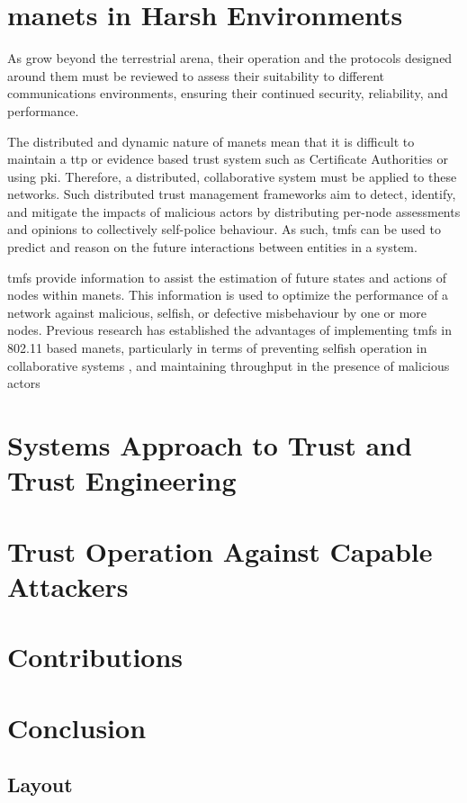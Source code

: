 
\section{\glspl{manet} in Harsh Environments}

As  grow beyond the terrestrial arena, their operation and the protocols designed around them must be reviewed to assess their suitability to different communications environments, ensuring their continued security, reliability, and performance.

The distributed and dynamic nature of \glspl{manet} mean that it is difficult to maintain a \gls{ttp} or evidence based trust system such as Certificate Authorities or using \gls{pki}.
Therefore, a distributed, collaborative system must be applied to these networks.
Such distributed trust management frameworks aim to detect, identify, and mitigate the impacts of malicious actors by distributing per-node assessments and opinions to collectively self-police behaviour.
As such, \glspl{tmf} can be used to predict and reason on the future interactions between entities in a system.

\glspl{tmf} provide information to assist the estimation of future states and actions of nodes within \glspl{manet}.
This information is used to optimize the performance of a network against malicious, selfish, or defective misbehaviour by one or more nodes.
Previous research has established the advantages of implementing \glspl{tmf} in 802.11 based \glspl{manet}, particularly in terms of preventing selfish operation in collaborative systems \cite{Li2007}, and maintaining throughput in the presence of malicious actors \cite{Buchegger2002}

\section{Systems Approach to Trust and Trust Engineering}


\section{Trust Operation Against Capable Attackers}


\section{Contributions}


\section{Conclusion}
\subsection{Layout}

\ifx\ifthesis\undefined
	
\fi
